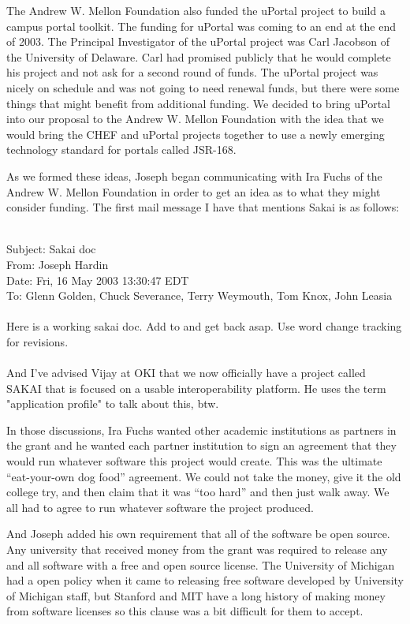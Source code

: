 \documentclass[12pt]{book}
\begin{document}
The Andrew W. Mellon Foundation also funded the uPortal project to build a campus
portal toolkit. The funding for uPortal was coming to an end at the end of 2003.
The Principal Investigator of the uPortal project was Carl Jacobson
of the University of Delaware.
Carl had promised publicly that he would complete his project and not ask for
a second round of funds.   The uPortal project was nicely on schedule and was not going
to need renewal funds, but there were some things that might benefit from additional
funding.  We decided to bring uPortal into our proposal to the Andrew W. Mellon
Foundation with the idea that we would bring the CHEF and uPortal projects together
to use a newly emerging technology standard for portals called JSR-168.

As we formed these ideas, Joseph began communicating with Ira Fuchs of the Andrew W. Mellon
Foundation in order to get an idea as to what they might consider funding.  The first
mail message I have that mentions Sakai is as follows:\\
\\
\begin{sf}
Subject: Sakai doc\\
From: Joseph Hardin \\
Date: Fri, 16 May 2003 13:30:47 EDT\\
To: Glenn Golden, Chuck Severance, Terry Weymouth,
Tom Knox, John Leasia\\
\\
Here is a working sakai doc.  Add to and get back asap.
Use word change tracking for revisions.\\
\\
And I've advised Vijay at OKI that we now officially have
a project called SAKAI that is focused on a usable
interoperability platform.  He uses the term
"application profile" to talk about this, btw.\\
\end{sf}

In those discussions, Ira Fuchs wanted
other academic institutions as partners in the grant and he wanted each
partner institution to sign an agreement that they would run
whatever software this project would create.  This was the ultimate ``eat-your-own dog food''
agreement.   We could not take the money, give it the old college try, and then claim that
it was ``too hard'' and then just walk away.  We all had to agree to run whatever software
the project produced.

And Joseph added his own requirement that all of the software be open source.  Any university
that received money from the grant was required to release any and all software with a free
and open source license.   The University of Michigan had a open policy when it came
to releasing free software developed by University of Michigan staff,  but Stanford and MIT
have a long history of making money from software licenses so this clause was a bit
difficult for them to accept.
\end{document}

